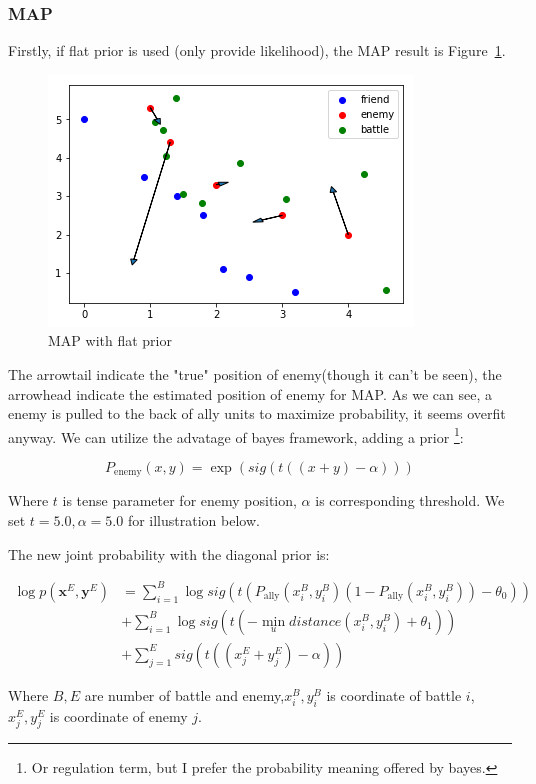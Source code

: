 \documentclass{article}
\begin{document}
\subsubsection{MAP}

Firstly, if flat prior is used (only provide likelihood), the MAP result is Figure~\ref{fig:MAPone}.

\begin{figure}[h]
\includegraphics[width=0.6\linewidth]{MAP1.png}
\caption{MAP with flat prior}
\label{fig:MAPone}
\end{figure}

The arrowtail indicate the "true" position of enemy(though it can't be seen), 
the arrowhead indicate the estimated position of enemy for MAP. As we can see,
a enemy is pulled to the back of ally units to maximize probability, it seems overfit anyway.
We can utilize the advatage of bayes framework, adding a prior \footnote{Or regulation term, but I
prefer the probability meaning offered by bayes.}:


$$
P_{\text{enemy}}(x,y) = \exp(sig(t((x+y) - \alpha)))
$$

Where $t$ is tense parameter for enemy position,
$\alpha$ is corresponding threshold. We set $t=5.0,\alpha=5.0$
for illustration below.

The new joint probability with the diagonal prior is:

\begin{align*}
\log p(\mathbf{x}^E,\mathbf{y}^E) &= \sum_{i=1}^B \log sig(t (P_\text{ally}(x^B_i,y^B_i)(1-P_\text{ally}(x^B_i,y^B_i)) - \theta_0)) \\
                                  &+ \sum_{i=1}^B \log sig(t(-\min_{u} distance(x^B_i,y^B_i) + \theta_1)) \\
                                  &+ \sum_{j=1}^E sig(t((x^E_j+y^E_j) - \alpha))
\end{align*}

Where $B,E$ are number of battle and enemy,$x^B_i,y^B_i$ is coordinate of battle $i$, $x^E_j,y^E_j$
is coordinate of enemy $j$.
\end{document}
